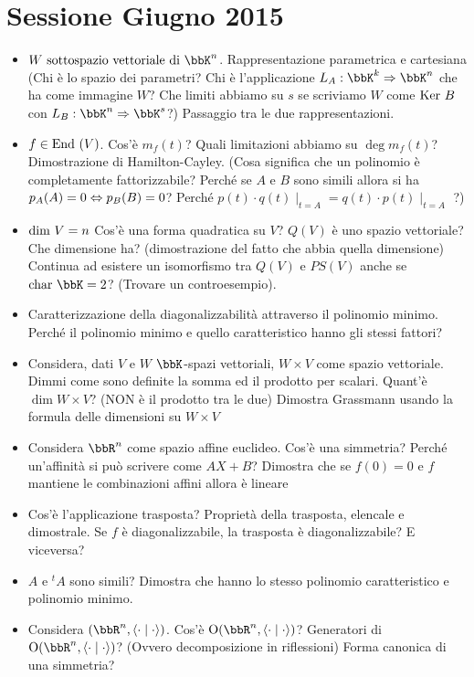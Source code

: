\documentclass[a4paper,NoNotes,GeneralMath]{stdmdoc}
\newcommand{\ssv}{\mbox{ sottospazio vettoriale di }}
\newcommand{\Char}{\mbox{char }}
\begin{document}
	\section*{Sessione Giugno 2015}
	\begin{itemize}
		\item $W \ssv \bbK ^n$. Rappresentazione parametrica e cartesiana (Chi è lo spazio dei parametri? Chi è l'applicazione $L_A: \bbK^k \rar \bbK^n$ che ha come immagine $W$? Che limiti abbiamo su $s$ se scriviamo $W$ come $\mbox{Ker } B$ con $L_B: \bbK^n \rar \bbK^s$?) Passaggio tra le due rappresentazioni.
		\item $f \in \mbox{End }(V)$. Cos'è $m_f(t)$? Quali limitazioni abbiamo su $\deg m_f(t)$? Dimostrazione di Hamilton-Cayley. (Cosa significa che un polinomio è completamente fattorizzabile? Perché se $A$ e $B$ sono simili allora si ha $p_A(A) = 0 \Leftrightarrow p_B(B) = 0$? Perché $p(t)\cdot q(t)\mid_{t=A} = q(t)\cdot p(t)\mid_{t=A}$ ?)
		\item $\mbox{dim } V = n$ Cos'è una forma quadratica su $V$? $Q(V)$ è uno spazio vettoriale? Che dimensione ha? (dimostrazione del fatto che abbia quella dimensione) Continua ad esistere un isomorfismo tra $Q(V)$ e $PS(V)$ anche se $\Char \bbK = 2$? (Trovare un controesempio).
		\item Caratterizzazione della diagonalizzabilità attraverso il polinomio minimo. Perché il polinomio minimo e quello caratteristico hanno gli stessi fattori?
		\item Considera, dati $V$ e $W$ $\bbK$-spazi vettoriali, $W\times V$ come spazio vettoriale. Dimmi come sono definite la somma ed il prodotto per scalari. Quant'è $\dim W\times V$? (NON è il prodotto tra le due) Dimostra Grassmann usando la formula delle dimensioni su $W\times V$
		\item Considera $\bbR^n$ come spazio affine euclideo. Cos'è una simmetria? Perché un'affinità si può scrivere come $AX+B$? Dimostra che se $f(0)=0$ e $f$ mantiene le combinazioni affini allora è lineare
		\item Cos'è l'applicazione trasposta? Proprietà della trasposta, elencale e dimostrale. Se $f$ è diagonalizzabile, la trasposta è diagonalizzabile? E viceversa?
		\item $A$ e ${}^tA$ sono simili? Dimostra che hanno lo stesso polinomio caratteristico e polinomio minimo.
		\item Considera $(\bbR^n, \scal{\cdot}{\cdot})$. Cos'è $\mbox{O}(\bbR^n, \scal{\cdot}{\cdot})$? Generatori di $\mbox{O}(\bbR^n, \scal{\cdot}{\cdot})$? (Ovvero decomposizione in riflessioni) Forma canonica di una simmetria?

\end{itemize}
\end{document}
